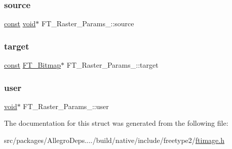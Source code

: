 \subsubsection{\texorpdfstring{source}{source}}
{\footnotesize\ttfamily \hyperlink{zconf_8h_a2c212835823e3c54a8ab6d95c652660e}{const} \hyperlink{png_8h_ac9c84fa68bbad002983e35ce3663c686}{void}$\ast$ F\+T\+\_\+\+Raster\+\_\+\+Params\+\_\+\+::source}

\mbox{\label{struct_f_t___raster___params___a2ba8941740db23ec91302aa9bd154da3}} 
\subsubsection{\texorpdfstring{target}{target}}
{\footnotesize\ttfamily \hyperlink{zconf_8h_a2c212835823e3c54a8ab6d95c652660e}{const} \hyperlink{ftimage_8h_ae28691030f2d16376937cf5e3485f921}{F\+T\+\_\+\+Bitmap}$\ast$ F\+T\+\_\+\+Raster\+\_\+\+Params\+\_\+\+::target}

\mbox{\label{struct_f_t___raster___params___af78bac59f93c989840bbcbcbefd77c55}} 
\subsubsection{\texorpdfstring{user}{user}}
{\footnotesize\ttfamily \hyperlink{png_8h_ac9c84fa68bbad002983e35ce3663c686}{void}$\ast$ F\+T\+\_\+\+Raster\+\_\+\+Params\+\_\+\+::user}



The documentation for this struct was generated from the following file\+:\begin{DoxyCompactItemize}
\item 
src/packages/\+Allegro\+Deps..../build/native/include/freetype2/\hyperlink{ftimage_8h}{ftimage.\+h}\end{DoxyCompactItemize}
